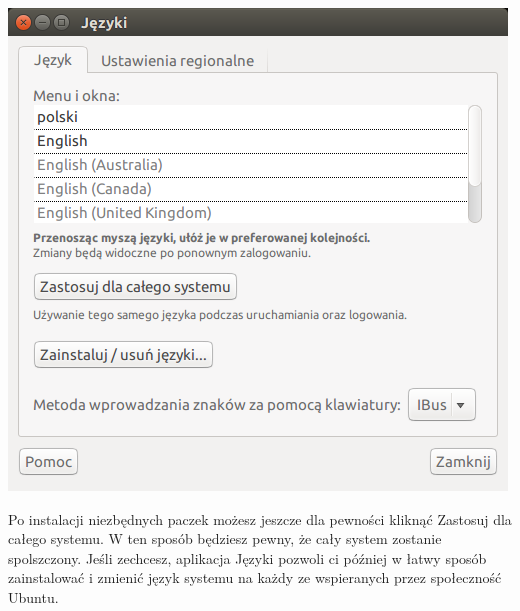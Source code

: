 \begin{center}
	\vspace{-10pt}
	\includegraphics{images/pierwsze_uruchomienie_lang2.png}
\end{center}

Po instalacji niezbędnych paczek możesz jeszcze dla pewności kliknąć \textcolor{ubuntu_orange}{Zastosuj dla całego systemu}. W ten sposób będziesz pewny, że cały system zostanie spolszczony.
Jeśli zechcesz, aplikacja \textcolor{ubuntu_orange}{Języki} pozwoli ci później w łatwy sposób zainstalować i zmienić język systemu na każdy ze wspieranych przez społeczność Ubuntu.
\clearpage
